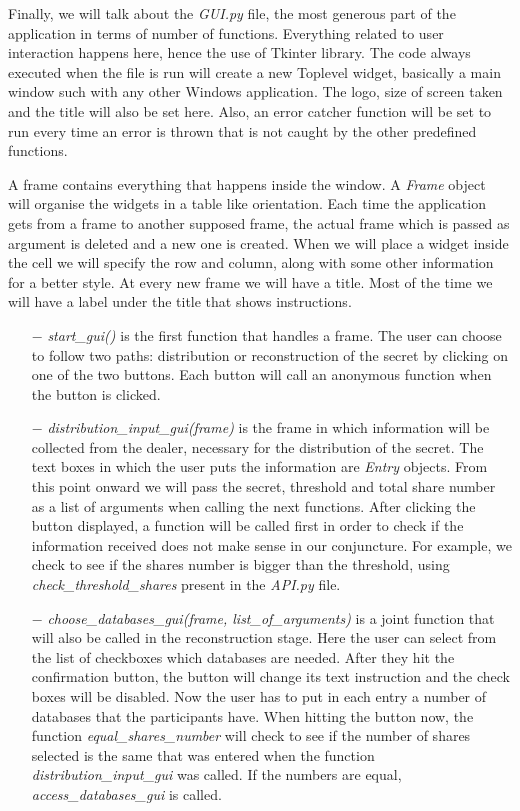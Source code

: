 \documentclass[12pt, a4paper, oneside]{book}
\begin{document}
    Finally, we will talk about the {\it GUI.py} file, the most generous part of the application in terms of number of functions. Everything related to user interaction happens here, hence the use of Tkinter library. The code always executed when the file is run will create a new Toplevel widget, basically a main window such with any other Windows application. The logo, size of screen taken and the title will also be set here. Also, an error catcher function will be set to run every time an error is thrown that is not caught by the other predefined functions. 
    
    A frame contains everything that happens inside the window. A {\it Frame} object will organise the widgets in a table like orientation. Each time the application gets from a frame to another supposed frame, the actual frame which is passed as argument is deleted and a new one is created. When we will place a widget inside the cell we will specify the row and column, along with some other information for a better style. At every new frame we will have a title. Most of the time we will have a label under the title that shows instructions.
    \begin{itemize}
        \item[$-$] {\it start\_gui()} is the first function that handles a frame. The user can choose to follow two paths: distribution or reconstruction of the secret by clicking on one of the two buttons. Each button will call an anonymous function when the button is clicked. 
    \end{itemize}
    \begin{itemize}
        \item[$-$] {\it distribution\_input\_gui(frame)} is the frame in which information will be collected from the dealer, necessary for the distribution of the secret. The text boxes in which the user puts the information are {\it Entry} objects. From this point onward we will pass the secret, threshold and total share number as a list of arguments when calling the next functions. After clicking the button displayed, a function will be called first in order to check if the information received does not make sense in our conjuncture. For example, we check to see if the shares number is bigger than the threshold, using {\it check\_threshold\_shares} present in the {\it API.py} file.
    \end{itemize}
    \begin{itemize}
        \item[$-$] {\it choose\_databases\_gui(frame, list\_of\_arguments)} is a joint function that will also be called in the reconstruction stage. Here the user can select from the list of checkboxes which databases are needed. After they hit the confirmation button, the button will change its text instruction and the check boxes will be disabled. Now the user has to put in each entry a number of databases that the participants have. When hitting the button now, the function {\it equal\_shares\_number} will check to see if the number of shares selected is the same that was entered when the function {\it distribution\_input\_gui} was called. If the numbers are equal, {\it access\_databases\_gui} is called.
    \end{itemize}
\end{document}
